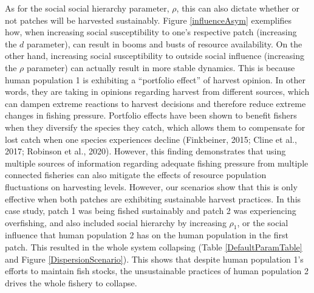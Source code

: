 \documentclass[
  12pt,
]{article}
\begin{document}
As for the social social hierarchy parameter, \(\rho\), this can also dictate whether or not patches will be harvested sustainably. Figure \ref{influenceAsym} exemplifies how, when increasing social susceptibility to one's respective patch (increasing the \(d\) parameter), can result in booms and busts of resource availability. On the other hand, increasing social susceptibility to outside social influence (increasing the \(\rho\) parameter) can actually result in more stable dynamics. This is because human population 1 is exhibiting a ``portfolio effect'' of harvest opinion. In other words, they are taking in opinions regarding harvest from different sources, which can dampen extreme reactions to harvest decisions and therefore reduce extreme changes in fishing pressure. Portfolio effects have been shown to benefit fishers when they diversify the species they catch, which allows them to compensate for lost catch when one species experiences decline (Finkbeiner, 2015; Cline et al., 2017; Robinson et al., 2020). However, this finding demonstrates that using multiple sources of information regarding adequate fishing pressure from multiple connected fisheries can also mitigate the effects of resource population fluctuations on harvesting levels. However, our scenarios show that this is only effective when both patches are exhibiting sustainable harvest practices. In this case study, patch 1 was being fished sustainably and patch 2 was experiencing overfishing, and also included social hierarchy by increasing \(\rho_1\), or the social influence that human population 2 has on the human population in the first patch. This resulted in the whole system collapsing (Table \ref{DefaultParamTable} and Figure \ref{DispersionScenario}). This shows that despite human population 1's efforts to maintain fish stocks, the unsustainable practices of human population 2 drives the whole fishery to collapse.
\end{document}
